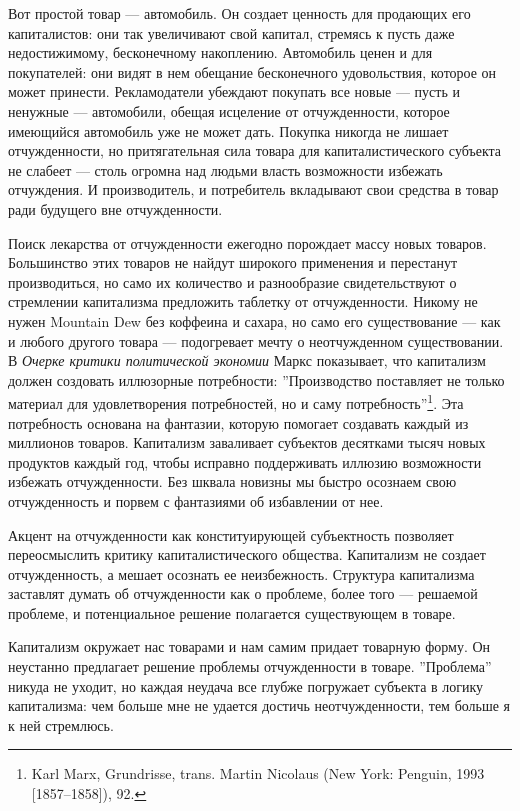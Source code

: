 \documentclass[12pt]{book}
\begin{document}
Вот простой товар --- автомобиль. Он создает ценность для продающих его капиталистов: они так увеличивают свой капитал, стремясь к пусть даже недостижимому, бесконечному накоплению. Автомобиль ценен и для покупателей: они видят в нем обещание бесконечного удовольствия, которое он может принести. Рекламодатели убеждают покупать все новые --- пусть и ненужные --- автомобили, обещая исцеление от отчужденности, которое имеющийся автомобиль уже не может дать. Покупка никогда не лишает отчужденности, но притягательная сила товара для капиталистического субъекта не слабеет --- столь огромна над людьми власть возможности избежать отчуждения. И производитель, и потребитель вкладывают свои средства в товар ради будущего вне отчужденности.

Поиск лекарства от отчужденности ежегодно порождает массу новых товаров. Большинство этих товаров не найдут широкого применения и перестанут производиться, но само их количество и разнообразие свидетельствуют о стремлении капитализма предложить таблетку от отчужденности. Никому не нужен Mountain Dew без коффеина и сахара, но само его существование --- как и любого другого товара --- подогревает мечту о неотчужденном существовании. В \textit{Очерке критики политической экономии} Маркс показывает, что капитализм должен создовать иллюзорные потребности: ''Производство поставляет не только материал для удовлетворения потребностей, но и саму потребность''\footnote{Karl Marx, Grundrisse, trans. Martin Nicolaus (New York: Penguin, 1993 [1857–1858]), 92.}. Эта потребность основана на фантазии, которую помогает создавать каждый из миллионов товаров. Капитализм заваливает субъектов десятками тысяч новых продуктов каждый год, чтобы исправно поддерживать иллюзию возможности избежать отчужденности. Без шквала новизны мы быстро осознаем свою отчужденность и порвем с фантазиями об избавлении от нее.

Акцент на отчужденности как конституирующей субъектность позволяет переосмыслить критику капиталистического общества. Капитализм не создает отчужденность, а мешает осознать ее неизбежность. Структура капитализма заставлят думать об отчужденности как о проблеме, более того --- решаемой проблеме, и потенциальное решение полагается существующем в товаре.

Капитализм окружает нас товарами и нам самим придает товарную форму. Он неустанно предлагает решение проблемы отчужденности в товаре. ''Проблема'' никуда не уходит, но каждая неудача все глубже погружает субъекта в логику капитализма: чем больше мне не удается достичь неотчужденности, тем больше я к ней стремлюсь.
\end{document}
